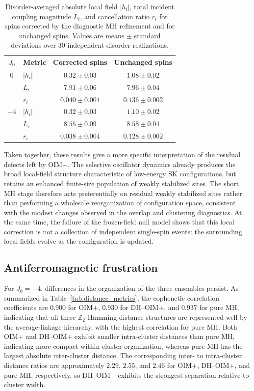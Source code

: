 \documentclass[
reprint,
amsmath,amssymb,
aps,
pre,
floatfix,
]{revtex4-2}
\begin{document}
\begin{table}[t]
\caption{
Disorder-averaged absolute local field $|h_i|$, total incident coupling
magnitude $L_i$, and cancellation ratio $r_i$ for spins corrected by the
diagnostic MH refinement and for unchanged spins. Values are means
$\pm$ standard deviations over 30 independent disorder realizations.
}
\label{tab:weak_field_metrics}
\centering
\begin{ruledtabular}
\begin{tabular}{c l c c}
$J_0$ & Metric & Corrected spins & Unchanged spins \\
\hline
$0$
& $|h_i|$ & $0.32\pm0.03$ & $1.08\pm0.02$ \\
& $L_i$    & $7.91\pm0.06$ & $7.96\pm0.04$ \\
& $r_i$    & $0.040\pm0.004$ & $0.136\pm0.002$ \\
\hline
$-4$
& $|h_i|$ & $0.32\pm0.03$ & $1.10\pm0.02$ \\
& $L_i$    & $8.55\pm0.09$ & $8.58\pm0.04$ \\
& $r_i$    & $0.038\pm0.004$ & $0.128\pm0.002$ \\
\end{tabular}
\end{ruledtabular}
\end{table}

Taken together, these results give a more specific interpretation of the
residual defects left by OIM+. The selective oscillator dynamics already
produces the broad local-field structure characteristic of low-energy SK
configurations, but retains an enhanced finite-size population of weakly
stabilized sites.
The short MH stage therefore acts preferentially on residual weakly
stabilized sites rather than performing a wholesale reorganization of
configuration space, consistent with the modest changes observed in the
overlap and clustering diagnostics. At the same time, the failure of the
frozen-field null model shows that this local correction is not a collection
of independent single-spin events: the surrounding local fields evolve as
the configuration is updated.

\subsection{Antiferromagnetic frustration} \label{sec:antiferro}

For $J_0=-4$, differences in the organization of the three ensembles
persist. As summarized in Table~\ref{tab:distance_metrics}, the
cophenetic correlation coefficients are $0.900$ for OIM+, $0.930$ for
DH--OIM+, and $0.937$ for pure MH, indicating that all three
$\mathbb{Z}_2$-Hamming-distance structures are represented
well by the average-linkage hierarchy, with the highest correlation for
pure MH. Both OIM+ and DH--OIM+ exhibit smaller intra-cluster distances
than pure MH, indicating more compact within-cluster organization,
whereas pure MH has the largest absolute inter-cluster distance. The
corresponding inter- to intra-cluster distance ratios are approximately
$2.29$, $2.55$, and $2.46$ for OIM+, DH--OIM+, and pure MH,
respectively, so DH--OIM+ exhibits the strongest separation relative to
cluster width.
\end{document}
